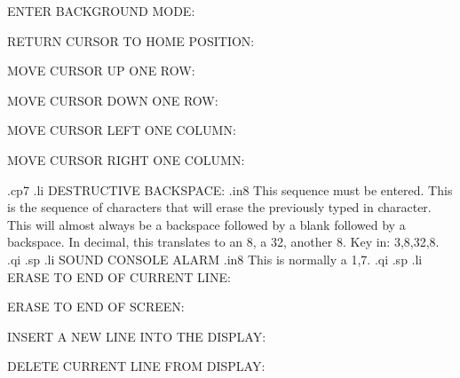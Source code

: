 ENTER BACKGROUND MODE:

RETURN CURSOR TO HOME POSITION:

MOVE CURSOR UP ONE ROW:

MOVE CURSOR DOWN ONE ROW:

MOVE CURSOR LEFT ONE COLUMN:

MOVE CURSOR RIGHT ONE COLUMN:

.cp7
.li
DESTRUCTIVE BACKSPACE:
.in8
This sequence must be entered.	This is the sequence of characters
that will erase the previously typed in character.  This will
almost always be a backspace followed by a blank followed by a backspace.
In decimal, this translates to an 8, a 32, another 8.  Key in:
3,8,32,8.
.qi
.sp
.li
SOUND CONSOLE ALARM
.in8
This is normally a 1,7.
.qi
.sp
.li
ERASE TO END OF CURRENT LINE:

ERASE TO END OF SCREEN:

INSERT A NEW LINE INTO THE DISPLAY:

DELETE CURRENT LINE FROM DISPLAY:

